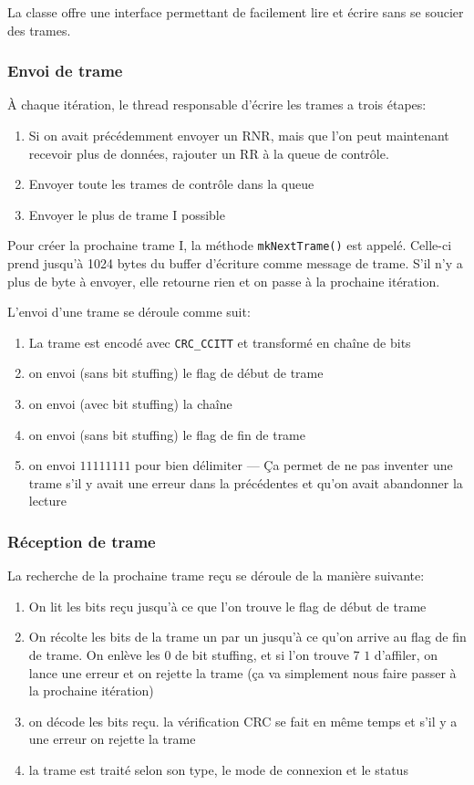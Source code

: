 \documentclass{article}
\begin{document}
    La classe offre une interface permettant de facilement lire et écrire sans se soucier des trames.

    \subsubsection{Envoi de trame}
    À chaque itération, le thread responsable d'écrire les trames a trois étapes:
    \begin{enumerate}
        \item Si on avait précédemment envoyer un RNR, mais que l'on peut maintenant recevoir plus de données, rajouter un RR à la queue de contrôle.
        \item Envoyer toute les trames de contrôle dans la queue
        \item Envoyer le plus de trame I possible
    \end{enumerate}
    Pour créer la prochaine trame I, la méthode \verb#mkNextTrame()# est appelé. Celle-ci prend jusqu'à 1024 bytes du buffer d'écriture comme message de trame. S'il n'y a plus de byte à envoyer, elle retourne rien et on passe à la prochaine itération.

    L'envoi d'une trame se déroule comme suit:
    \begin{enumerate}
        \item La trame est encodé avec \verb#CRC_CCITT# et transformé en chaîne de bits
        \item on envoi (sans bit stuffing) le flag de début de trame
        \item on envoi (avec bit stuffing) la chaîne
        \item on envoi (sans bit stuffing) le flag de fin de trame
        \item on envoi $11111111$ pour bien délimiter --- Ça permet de ne pas inventer une trame s'il y avait une erreur dans la précédentes et qu'on avait abandonner la lecture
    \end{enumerate}

    \subsubsection{Réception de trame}
    La recherche de la prochaine trame reçu se déroule de la manière suivante:
    \begin{enumerate}
        \item On lit les bits reçu jusqu'à ce que l'on trouve le flag de début de trame
        \item On récolte les bits de la trame un par un jusqu'à ce qu'on arrive au flag de fin de trame. On enlève les $0$ de bit stuffing, et si l'on trouve 7 $1$ d'affiler, on lance une erreur et on rejette la trame (ça va simplement nous faire passer à la prochaine itération)
        \item on décode les bits reçu. la vérification CRC se fait en même temps et s'il y a une erreur on rejette la trame
        \item la trame est traité selon son type, le mode de connexion et le status
    \end{enumerate}
\end{document}
